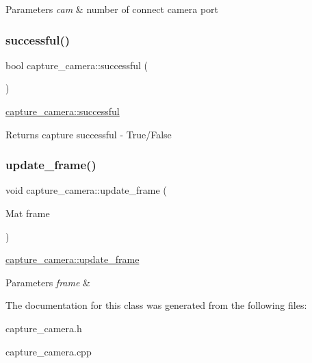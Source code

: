 \begin{DoxyParams}{Parameters}
{\em cam} & number of connect camera port \\
\hline
\end{DoxyParams}
\mbox{\label{classcapture__camera_acba0e792dbd2136b7a6273e1fe0f05a4}} 
\subsubsection{\texorpdfstring{successful()}{successful()}}
{\footnotesize\ttfamily bool capture\+\_\+camera\+::successful (\begin{DoxyParamCaption}{ }\end{DoxyParamCaption})}



\mbox{\hyperlink{classcapture__camera_acba0e792dbd2136b7a6273e1fe0f05a4}{capture\+\_\+camera\+::successful}} 

\begin{DoxyReturn}{Returns}
capture successful -\/ True/\+False 
\end{DoxyReturn}
\mbox{\label{classcapture__camera_a07d88d50c866430da2dd5cf4362c2a67}} 
\subsubsection{\texorpdfstring{update\+\_\+frame()}{update\_frame()}}
{\footnotesize\ttfamily void capture\+\_\+camera\+::update\+\_\+frame (\begin{DoxyParamCaption}\item[{Mat}]{frame }\end{DoxyParamCaption})}



\mbox{\hyperlink{classcapture__camera_a07d88d50c866430da2dd5cf4362c2a67}{capture\+\_\+camera\+::update\+\_\+frame}} 


\begin{DoxyParams}{Parameters}
{\em frame} & \\
\hline
\end{DoxyParams}


The documentation for this class was generated from the following files\+:\begin{DoxyCompactItemize}
\item 
capture\+\_\+camera.\+h\item 
capture\+\_\+camera.\+cpp\end{DoxyCompactItemize}
